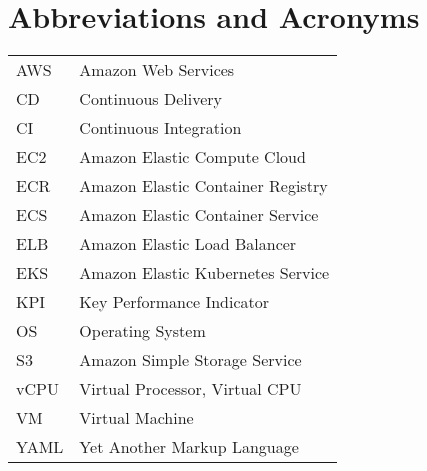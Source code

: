 \pagestyle{empty}

\null\vfill
\chapter*{Abbreviations and Acronyms}
    \begin{tabular}{ll}
        AWS & Amazon Web Services \\
        CD & Continuous Delivery \\
        CI & Continuous Integration \\
        EC2 & Amazon Elastic Compute Cloud \\
        ECR & Amazon Elastic Container Registry \\
        ECS & Amazon Elastic Container Service \\
        ELB & Amazon Elastic Load Balancer \\
        EKS & Amazon Elastic Kubernetes Service \\
        KPI & Key Performance Indicator \\
        OS & Operating System \\
        S3 & Amazon Simple Storage Service \\
        vCPU & Virtual Processor, Virtual CPU \\
        VM & Virtual Machine \\
        YAML & Yet Another Markup Language \\
\end{tabular}

\vspace{10cm}

\clearpage

